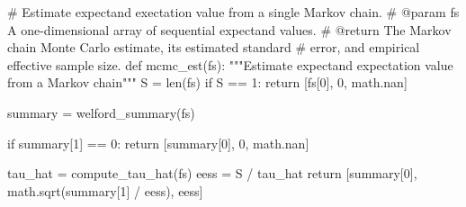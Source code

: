 \documentclass[
  letterpaper,
  DIV=11,
  numbers=noendperiod]{scrartcl}
\newenvironment{Shaded}{\begin{snugshade}}{\end{snugshade}}
\newcommand{\BuiltInTok}[1]{\textcolor[rgb]{0.00,0.23,0.31}{#1}}
\newcommand{\CommentTok}[1]{\textcolor[rgb]{0.37,0.37,0.37}{#1}}
\newcommand{\ControlFlowTok}[1]{\textcolor[rgb]{0.00,0.23,0.31}{#1}}
\newcommand{\DecValTok}[1]{\textcolor[rgb]{0.68,0.00,0.00}{#1}}
\newcommand{\KeywordTok}[1]{\textcolor[rgb]{0.00,0.23,0.31}{#1}}
\newcommand{\NormalTok}[1]{\textcolor[rgb]{0.00,0.23,0.31}{#1}}
\newcommand{\OperatorTok}[1]{\textcolor[rgb]{0.37,0.37,0.37}{#1}}
\begin{document}
\begin{Shaded}
\begin{Highlighting}[]
\CommentTok{\# Estimate expectand exectation value from a single Markov chain.}
\CommentTok{\# @param fs A one{-}dimensional array of sequential expectand values.}
\CommentTok{\# @return The Markov chain Monte Carlo estimate, its estimated standard }
\CommentTok{\#         error, and empirical effective sample size.}
\KeywordTok{def}\NormalTok{ mcmc\_est(fs):}
  \CommentTok{"""Estimate expectand expectation value from a Markov chain"""}
\NormalTok{  S }\OperatorTok{=} \BuiltInTok{len}\NormalTok{(fs)}
  \ControlFlowTok{if}\NormalTok{ S }\OperatorTok{==} \DecValTok{1}\NormalTok{:}
    \ControlFlowTok{return}\NormalTok{ [fs[}\DecValTok{0}\NormalTok{], }\DecValTok{0}\NormalTok{, math.nan]}
  
\NormalTok{  summary }\OperatorTok{=}\NormalTok{ welford\_summary(fs)}
  
  \ControlFlowTok{if}\NormalTok{ summary[}\DecValTok{1}\NormalTok{] }\OperatorTok{==} \DecValTok{0}\NormalTok{:}
    \ControlFlowTok{return}\NormalTok{ [summary[}\DecValTok{0}\NormalTok{], }\DecValTok{0}\NormalTok{, math.nan]}
  
\NormalTok{  tau\_hat }\OperatorTok{=}\NormalTok{ compute\_tau\_hat(fs)}
\NormalTok{  eess }\OperatorTok{=}\NormalTok{ S }\OperatorTok{/}\NormalTok{ tau\_hat}
  \ControlFlowTok{return}\NormalTok{ [summary[}\DecValTok{0}\NormalTok{], math.sqrt(summary[}\DecValTok{1}\NormalTok{] }\OperatorTok{/}\NormalTok{ eess), eess]}
\end{Highlighting}
\end{Shaded}
\end{document}
